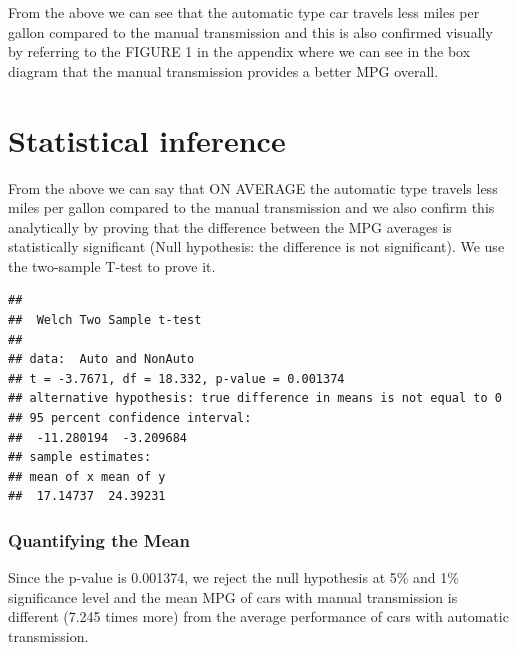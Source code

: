 \documentclass[]{article}
\newenvironment{Shaded}{\begin{snugshade}}{\end{snugshade}}
\newcommand{\KeywordTok}[1]{\textcolor[rgb]{0.13,0.29,0.53}{\textbf{#1}}}
\newcommand{\NormalTok}[1]{#1}
\newcommand{\OperatorTok}[1]{\textcolor[rgb]{0.81,0.36,0.00}{\textbf{#1}}}
\newcommand{\StringTok}[1]{\textcolor[rgb]{0.31,0.60,0.02}{#1}}
\begin{document}
From the above we can see that the automatic type car travels less miles
per gallon compared to the manual transmission and this is also
confirmed visually by referring to the FIGURE 1 in the appendix where we
can see in the box diagram that the manual transmission provides a
better MPG overall.

\hypertarget{statistical-inference}{%
\section{Statistical inference}\label{statistical-inference}}

From the above we can say that ON AVERAGE the automatic type travels
less miles per gallon compared to the manual transmission and we also
confirm this analytically by proving that the difference between the MPG
averages is statistically significant (Null hypothesis: the difference
is not significant). We use the two-sample T-test to prove it.

\begin{Shaded}
\end{Shaded}

\begin{verbatim}
## 
##  Welch Two Sample t-test
## 
## data:  Auto and NonAuto
## t = -3.7671, df = 18.332, p-value = 0.001374
## alternative hypothesis: true difference in means is not equal to 0
## 95 percent confidence interval:
##  -11.280194  -3.209684
## sample estimates:
## mean of x mean of y 
##  17.14737  24.39231
\end{verbatim}

\hypertarget{quantifying-the-mean}{%
\subsubsection{Quantifying the Mean}\label{quantifying-the-mean}}

Since the p-value is 0.001374, we reject the null hypothesis at 5\% and
1\% significance level and the mean MPG of cars with manual transmission
is different (7.245 times more) from the average performance of cars
with automatic transmission.
\end{document}
